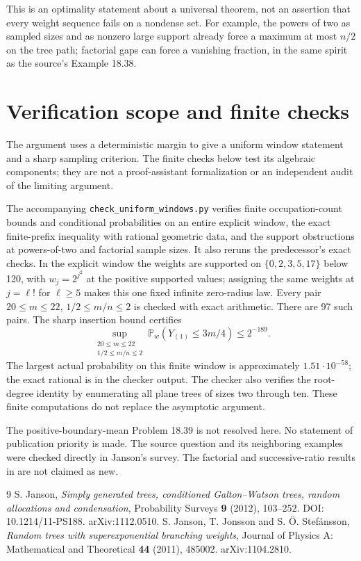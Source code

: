 \documentclass[11pt]{article}
\theoremstyle{remark}\newtheorem{remark}[theorem]{Remark}
\newcommand{\Pp}{\mathbb P}
\begin{document}
This is an optimality statement about a universal theorem, not an assertion
that every weight sequence fails on a nondense set. For example, the powers
of two as sampled sizes and as nonzero large support already force a
maximum at most $n/2$ on the tree path; factorial gaps can force a vanishing
fraction, in the same spirit as the source's Example 18.38.

\section{Verification scope and finite checks}
The argument uses a deterministic margin to give a uniform window statement
and a sharp sampling criterion. The finite checks below test its algebraic
components; they are not a proof-assistant formalization or an independent
audit of the limiting argument.

The accompanying \texttt{check\_uniform\_windows.py} verifies finite
occupation-count bounds and conditional probabilities on an entire explicit
window, the exact finite-prefix inequality with rational geometric data,
and the support obstructions at powers-of-two and factorial sample sizes.
It also reruns the predecessor's exact checks. In the explicit window the
weights are supported on $\{0,2,3,5,17\}$ below 120, with
$w_j=2^{j^2}$ at the positive supported values; assigning the same weights
at $j=\ell!$ for $\ell\ge5$ makes this one fixed infinite zero-radius law.
Every pair $20\le m\le22$, $1/2\le m/n\le2$ is checked with exact arithmetic.
There are 97 such pairs. The sharp insertion bound certifies
\[
 \sup_{\substack{20\le m\le22\\1/2\le m/n\le2}}
 \Pp_w(Y_{(1)}\le3m/4)\le2^{-189}.
\]
The largest actual probability on this finite window is approximately
$1.51\cdot10^{-58}$; the exact rational is in the checker output. The
checker also verifies the root-degree identity by enumerating all plane
trees of sizes two through ten.
These finite computations do not replace the asymptotic argument.

The positive-boundary-mean Problem 18.39 is not resolved here. No statement
of publication priority is made. The source question and its neighboring
examples were checked directly in Janson's survey. The factorial and
successive-ratio results in \cite{JJS} are not claimed as new.

\begin{thebibliography}{9}
S. Janson,
\emph{Simply generated trees, conditioned Galton--Watson trees, random
allocations and condensation},
Probability Surveys \textbf{9} (2012), 103--252.
DOI: 10.1214/11-PS188. arXiv:1112.0510.
S. Janson, T. Jonsson and S. \"O. Stef\'ansson,
\emph{Random trees with superexponential branching weights},
Journal of Physics A: Mathematical and Theoretical \textbf{44} (2011), 485002.
arXiv:1104.2810.
\end{thebibliography}
\end{document}
